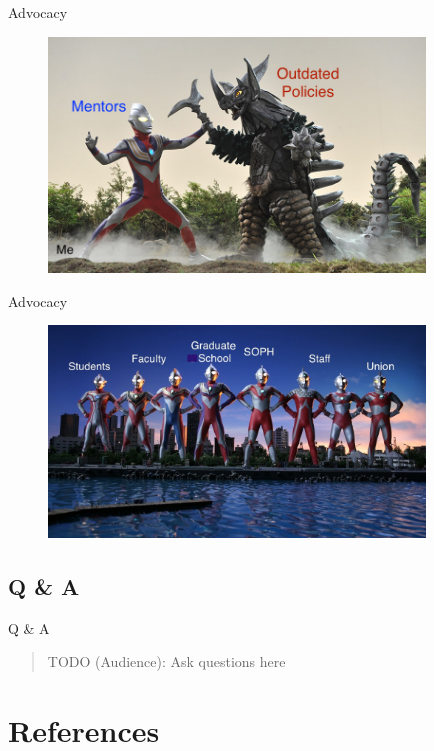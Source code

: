 \documentclass[
  ignorenonframetext,
  aspectratio=169]{beamer}
\begin{document}
\begin{frame}{Advocacy}
\begin{figure}
\centering
\includegraphics[width=10cm]{Mentors_VS_Policies.jpg}
\end{figure}
\end{frame}

\begin{frame}{Advocacy}
\protect\hypertarget{advocacy-1}{}
\begin{figure}
\centering
\includegraphics[width=10cm]{all_helps.jpg}
\end{figure}
\end{frame}

\hypertarget{q-a}{%
\subsection{Q \& A}\label{q-a}}

\begin{frame}{Q \& A}
\begin{quote}
TODO (Audience): Ask questions here
\end{quote}
\end{frame}

\hypertarget{references}{%
\section*{References}\label{references}}
\end{document}

